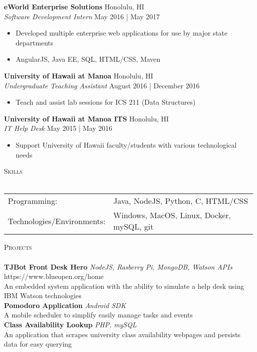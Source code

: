 \documentclass[a4paper]{article}
\newcommand{\lineunder} {
    \vspace*{-8pt} \\
    \hspace*{-18pt} \hrulefill \\
}
\newcommand{\header} [1] {
    {\hspace*{-18pt}\vspace*{6pt} \textsc{#1}}
    \vspace*{-6pt} \lineunder
}
\begin{document}
\textbf{eWorld Enterprise Solutions} \hfill Honolulu, HI\\
\textit{Software Development Intern} \hfill May 2016 | May 2017\\
\vspace{-1mm}
\begin{itemize} \itemsep 1pt
	\item Developed multiple enterprise web applications for use by major state departments
	\item AngularJS, Java EE, SQL, HTML/CSS, Maven
\end{itemize}

\textbf{University of Hawaii at Manoa} \hfill Honolulu, HI\\
\textit{Undergraduate Teaching Assistant} \hfill August 2016 | December 2016\\
\vspace{-1mm}
\begin{itemize} \itemsep 1pt
	\item Teach and assist lab sessions for ICS 211 (Data Structures)
\end{itemize}

\textbf{University of Hawaii at Manoa ITS} \hfill Honolulu, HI\\
\textit{IT Help Desk} \hfill May 2015 | May 2016\\
\vspace{-1mm}
\begin{itemize} \itemsep 1pt
	\item Support University of Hawaii faculty/students with various technological needs
\end{itemize}

\header{Skills}
\begin{tabular}{ l l }
	Programming:                    & Java, NodeJS, Python, C, HTML/CSS    \\
	Technologies/Environments: & Windows, MacOS, Linux, Docker, mySQL, git \\
\end{tabular}

\vspace*{2mm}

\header{Projects}
{\textbf{TJBot Front Desk Hero} \sl NodeJS, Rasberry Pi, MongoDB, Watson APIs} \hfill https://www.blueopen.org/home\\
An embedded system application with the ability to simulate a help desk using IBM Watson technologies\\
\vspace*{2mm}
{\textbf{Pomodoro Application} \sl Android SDK} \\
A mobile scheduler to simplify easily manage tasks and events\\
\vspace*{2mm}
{\textbf{Class Availability Lookup} \sl PHP, mySQL} \\
An application that scrapes university class availability webpages and persists data for easy querying\\
\vspace*{2mm}

\vspace*{2mm}



\
\end{document}
